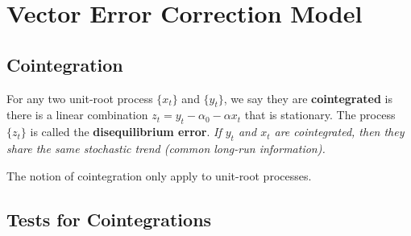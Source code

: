 \documentclass[11pt]{article}
\begin{document}
	    
	\section{Vector Error Correction Model}
		\subsection{Cointegration}
		    \begin{definition}
		        For any two unit-root process $\{x_t\}$ and $\{y_t\}$, we say they are \textbf{cointegrated} is there is a linear combination $z_t = y_t - \alpha_0 - \alpha x_t$ that is stationary. The process $\{z_t\}$ is called the \textbf{disequilibrium error}. \emph{If $y_t$ and $x_t$ are cointegrated, then they share the same stochastic trend (common long-run information).}
		    \end{definition}
		    
		    \begin{remark}
		    	The notion of cointegration only apply to unit-root processes.
		    \end{remark}
		   
		\subsection{Tests for Cointegrations}
		    
\end{document}
